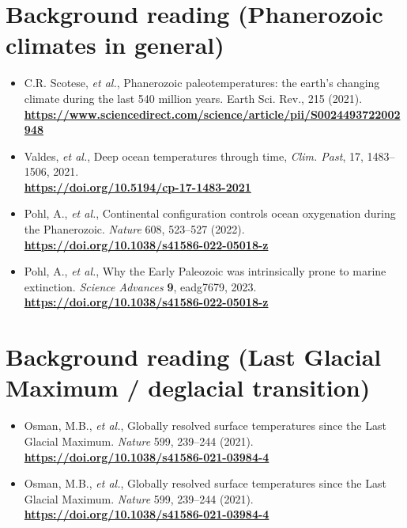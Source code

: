 \section*{Background reading (Phanerozoic climates in general)}
\begin{itemize}
\vspace{1mm}
\item C.R. Scotese, \textit{et al.}, Phanerozoic paleotemperatures: the earth’s changing climate during the last 540 million years. Earth Sci. Rev., 215 (2021).
\\\textbf{\href{https://www.sciencedirect.com/science/article/pii/S0024493722002948}{https://www.sciencedirect.com/science/article/pii/S0024493722002948}}
\vspace{1mm}
\item Valdes, \textit{et al.}, Deep ocean temperatures through time, \textit{Clim. Past}, 17, 1483–1506, 2021.
\\\textbf{\href{https://doi.org/10.5194/cp-17-1483-2021}{https://doi.org/10.5194/cp-17-1483-2021}}
\vspace{1mm}
\item Pohl, A., \textit{et al.}, Continental configuration controls ocean oxygenation during the Phanerozoic. \textit{Nature} 608, 523–527 (2022).
\\\textbf{\href{https://doi.org/10.1038/s41586-022-05018-z}{https://doi.org/10.1038/s41586-022-05018-z}}
\item Pohl, A., \textit{et al.}, Why the Early Paleozoic was intrinsically prone to
marine extinction. \textit{Science Advances} \textbf{9}, eadg7679,  2023.
\\\textbf{\href{https://doi.org/10.1038/s41586-022-05018-z}{https://doi.org/10.1038/s41586-022-05018-z}}
\end{itemize}

\section*{Background reading (Last Glacial Maximum / deglacial transition)}
\begin{itemize}
\vspace{1mm}
\item Osman, M.B., \textit{et al.}, Globally resolved surface temperatures since the Last Glacial Maximum. \textit{Nature} 599, 239–244 (2021). \\\textbf{\href{https://doi.org/10.1038/s41586-021-03984-4}{https://doi.org/10.1038/s41586-021-03984-4}}
\vspace{1mm}
\item Osman, M.B., \textit{et al.}, Globally resolved surface temperatures since the Last Glacial Maximum. \textit{Nature} 599, 239–244 (2021). \\\textbf{\href{https://doi.org/10.1038/s41586-021-03984-4}{https://doi.org/10.1038/s41586-021-03984-4}}
\end{itemize}

